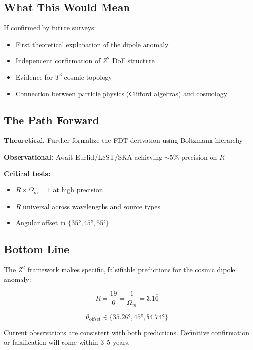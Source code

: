 \documentclass[12pt,a4paper]{article}
\begin{document}
\subsection{What This Would Mean}

If confirmed by future surveys:
\begin{itemize}
    \item First theoretical explanation of the dipole anomaly
    \item Independent confirmation of $Z^2$ DoF structure
    \item Evidence for $T^3$ cosmic topology
    \item Connection between particle physics (Clifford algebras) and cosmology
\end{itemize}

\subsection{The Path Forward}

\textbf{Theoretical:} Further formalize the FDT derivation using Boltzmann hierarchy

\textbf{Observational:} Await Euclid/LSST/SKA achieving $\sim 5\%$ precision on $R$

\textbf{Critical tests:}
\begin{itemize}
    \item $R \times \Omega_m = 1$ at high precision
    \item $R$ universal across wavelengths and source types
    \item Angular offset in $\{35°, 45°, 55°\}$
\end{itemize}

\subsection{Bottom Line}

The $Z^2$ framework makes specific, falsifiable predictions for the cosmic dipole anomaly:

\begin{equation}
\boxed{R = \frac{19}{6} = \frac{1}{\Omega_m} = 3.1\overline{6}}
\end{equation}

\begin{equation}
\boxed{\theta_{\text{offset}} \in \{35.26°, 45°, 54.74°\}}
\end{equation}

Current observations are consistent with both predictions. Definitive confirmation or falsification will come within 3--5 years.
\end{document}
